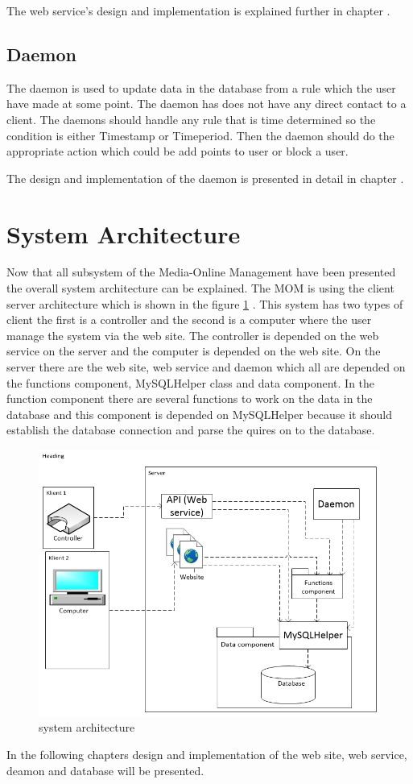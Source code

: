 The web service's design and implementation is explained further in chapter .


\subsection{Daemon}
The daemon is used to update data in the database from a rule which the user have made at some point. The daemon has does not have any direct contact to a client. The daemons should handle any rule that is time determined so the condition is either Timestamp or Timeperiod. Then the daemon should do the appropriate action which could be add points to user or block a user.

The design and implementation of the daemon is presented in detail in chapter . 
 
\section{System Architecture}
\label{sec:sysArchitecture}
Now that all subsystem of the Media-Online Management have been presented the overall system architecture can be explained. The MOM is using the client server architecture which is shown in the figure \ref{fig:serveroverview} \citep{OOAD}. This system has two types of client the first is a controller and the second is a computer where the user manage the system via the web site. The controller is depended on the web service on the server and the computer is depended on the web site. On the server there are the web site, web service and daemon which all are depended on the functions component, MySQLHelper class and data component. In the function component there are several functions to work on the data in the database and this component is depended on MySQLHelper because it should establish the database connection and parse the quires on to the database. 

\begin{figure}
	\centering
		\includegraphics[width=1.00\textwidth]{images/serveroverview.jpg}
	\caption{system architecture}
	\label{fig:serveroverview}
\end{figure}

In the following chapters design and implementation of the web site, web service, deamon and database will be presented.

 


